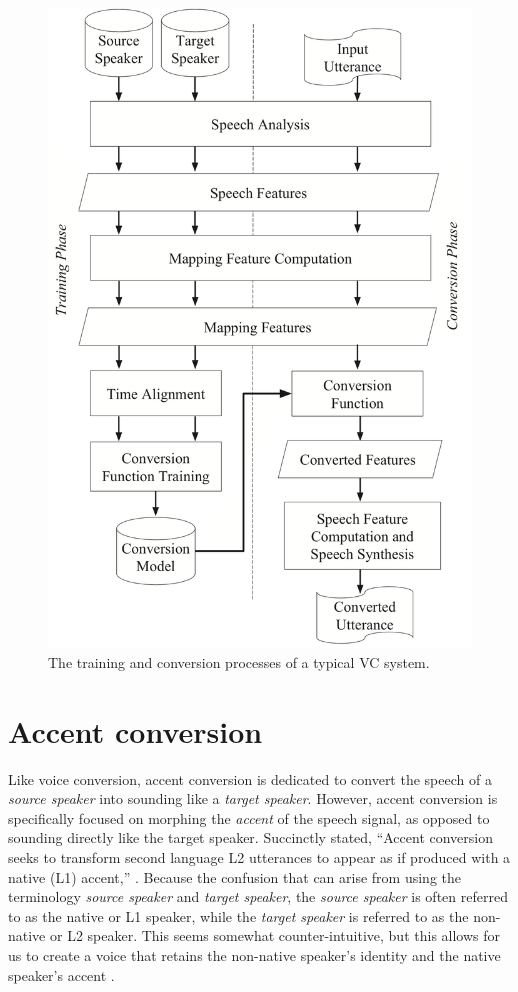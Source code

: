 \documentclass
[
    a4paper,
    twoside,
    12pt,
]
{report}
\begin{document}
\begin{figure}[H]
\centering
\includegraphics[scale=0.20]{img/vc-flowchart.png}
\caption{The training and conversion processes of a typical VC system.}
\label{fig:vc-flowchart}
\end{figure}

\hypertarget{accent-conversion}{%
\section{Accent conversion}\label{accent-conversion}}

Like voice conversion, accent conversion is dedicated to convert the
speech of a \emph{source speaker} into sounding like a \emph{target
speaker}. However, accent conversion is specifically focused on morphing
the \emph{accent} of the speech signal, as opposed to sounding directly
like the target speaker. Succinctly stated, ``Accent conversion seeks to
transform second language L2 utterances to appear as if produced with a
native (L1) accent,'' \parencite{aryal2014a}. Because the confusion that
can arise from using the terminology \emph{source speaker} and
\emph{target speaker}, the \emph{source speaker} is often referred to as
the native or L1 speaker, while the \emph{target speaker} is referred to
as the non-native or L2 speaker. This seems somewhat counter-intuitive,
but this allows for us to create a voice that retains the non-native
speaker's identity and the native speaker's accent
\parencite{zhao2018a}.
\end{document}
